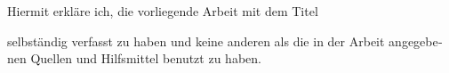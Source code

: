 \begin{otherlanguage}{ngerman} 
\begin{declaration}[Selbstständigkeitserklärung]

Hiermit erkläre ich, die vorliegende Arbeit mit dem Titel 

\begin{center}
	\makeatletter
	\textbf{\@title}
	
	\makeatother
\end{center}


selbständig verfasst zu haben und keine anderen als die in der Arbeit angegebenen Quellen und Hilfsmittel benutzt zu haben.

\vspace{15mm}
\flushright
\makeatletter
\@author{}

\makeatother

\end{declaration}
\end{otherlanguage}  
